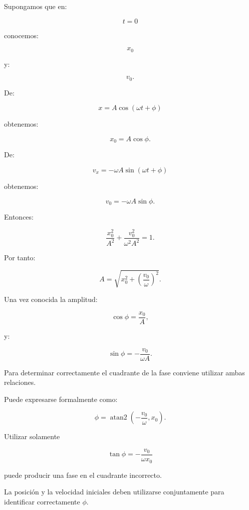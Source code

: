 Supongamos que en:

\[ t=0 \]

conocemos:

\[ x_0 \]

y:

\[ v_0. \]

De:

\[ x=A\cos(\omega t+\phi) \]

obtenemos:

\[ x_0=A\cos\phi. \]

De:

\[ v_x=-\omega A\sin(\omega t+\phi) \]

obtenemos:

\[ v_0=-\omega A\sin\phi. \]

Entonces:

\[ \frac{x_0^2}{A^2}+\frac{v_0^2}{\omega^2A^2}=1. \]

Por tanto:

\[ \boxed{A=\sqrt{x_0^2+\left(\frac{v_0}{\omega}\right)^2}}. \]

Una vez conocida la amplitud:

\[ \cos\phi=\frac{x_0}{A}, \]

y:

\[ \sin\phi=-\frac{v_0}{\omega A}. \]

Para determinar correctamente el cuadrante de la fase conviene utilizar ambas relaciones.

Puede expresarse formalmente como:

\[ \boxed{\phi=\operatorname{atan2}\left(-\frac{v_0}{\omega},x_0\right)}. \]

\begin{advertencia}
Utilizar solamente

\[ \tan\phi=-\frac{v_0}{\omega x_0} \]

puede producir una fase en el cuadrante incorrecto.

La posición y la velocidad iniciales deben utilizarse conjuntamente para identificar correctamente \(\phi\).
\end{advertencia}

